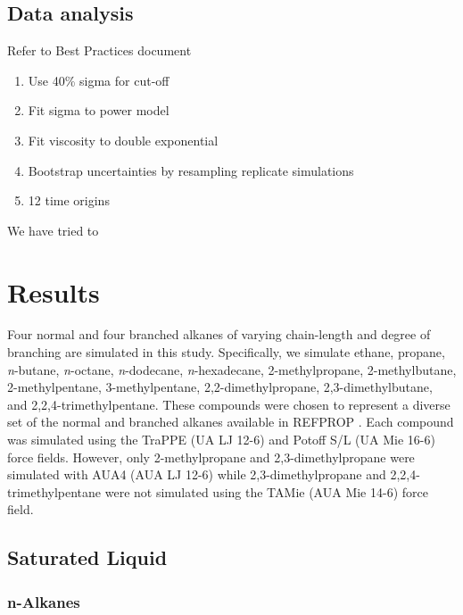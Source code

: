 \documentclass[preprint,review,12pt]{elsarticle}
\begin{document}
\subsection{Data analysis}

Refer to Best Practices document

\begin{enumerate}
	\item Use 40\% sigma for cut-off
	\item Fit sigma to power model
	\item Fit viscosity to double exponential
	\item Bootstrap uncertainties by resampling replicate simulations
	\item 12 time origins
\end{enumerate}

We have tried to 

\section{Results}

Four normal and four branched alkanes of varying chain-length and degree of branching are simulated in this study. Specifically, we simulate ethane, propane, \textit{n}-butane, \textit{n}-octane, \textit{n}-dodecane, \textit{n}-hexadecane, 2-methylpropane, 2-methylbutane, 2-methylpentane, 3-methylpentane, 2,2-dimethylpropane, 2,3-dimethylbutane, and 2,2,4-trimethylpentane. These compounds were chosen to represent a diverse set of the normal and branched alkanes available in REFPROP \cite{LEMMON-RP91,Ethane2006,Propane2009,Butane2006,Beckmueller2017,Lemmon2006,Blackham2017}. Each compound was simulated using the TraPPE (UA LJ 12-6) and Potoff S/L (UA Mie 16-6) force fields. However, only 2-methylpropane and 2,3-dimethylpropane were simulated with AUA4 (AUA LJ 12-6) while 2,3-dimethylpropane and 2,2,4-trimethylpentane were not simulated using the TAMie (AUA Mie 14-6) force field.

\subsection{Saturated Liquid} \label{sec:eta_sat}

\subsubsection{n-Alkanes}

\end{document}
